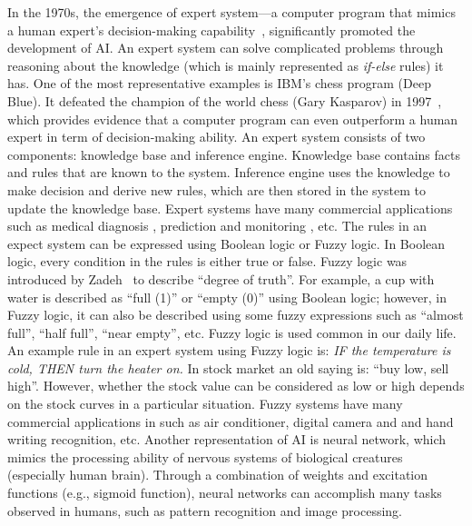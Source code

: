In the 1970s, the emergence of expert system---a computer program that mimics a human expert's decision-making capability~\cite{Jackson1998}, significantly promoted the development of AI. An expert system can solve complicated problems through reasoning about the knowledge (which is mainly represented as \textit{if-else} rules) it has. One of the most representative examples is IBM's chess program (Deep Blue). It defeated the champion of the world chess (Gary Kasparov) in 1997~\cite{Newborn1992}, which provides evidence that a computer program can even outperform a human expert in term of decision-making ability. An expert system consists of two components: knowledge base and inference engine. Knowledge base contains facts and rules that are known to the system. Inference engine uses the knowledge to make decision and derive new rules, which are then stored in the system to update the knowledge base. Expert systems have many commercial applications such as medical diagnosis \cite{Jonathan1990}, prediction \cite{Robert1993} and monitoring \cite{Salvaneschi1996}, etc. The rules in an expect system can be expressed using Boolean logic or Fuzzy logic. In Boolean logic, every condition in the rules is either true or false. Fuzzy logic was introduced by Zadeh~\cite{Zadeh:IC:1965} to describe ``degree of truth''. For example, a cup with water is described as ``full (1)'' or ``empty (0)'' using Boolean logic; however, in Fuzzy logic, it can also be described using some fuzzy expressions such as ``almost full'', ``half full'', ``near empty'', etc. Fuzzy logic is used common in our daily life. An example rule in an expert system using Fuzzy logic is: \textit{IF the temperature is cold, THEN turn the heater on.} In stock market an old saying is: ``buy low, sell high''. However, whether the stock value can be considered as low or high depends on the stock curves in a particular situation. Fuzzy systems have many commercial applications in such as air conditioner, digital camera and and hand writing recognition, etc. Another representation of AI is neural network, which mimics the processing ability of nervous systems of biological creatures (especially human brain). Through a combination of weights and excitation functions (e.g., sigmoid function), neural networks can accomplish many tasks observed in humans, such as pattern recognition and image processing. 


